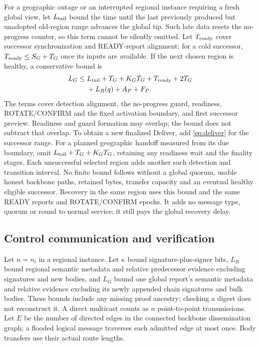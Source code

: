 \documentclass[11pt,a4paper,onecolumn]{article}
\theoremstyle{remark}\newtheorem{example}[definition]{Example}
\begin{document}
For a geographic outage or an interrupted regional instance requiring a fresh
global view, let $L_{\rm tail}$ bound the time until the last
previously produced but unadopted old-region range advances the global tip.
Such late data resets the no-progress counter, so this term cannot be silently
omitted. Let $T_{\rm ready}$ cover successor synchronization and READY-report
alignment; for a cold successor, $T_{\rm ready}\leq S_G+T_G$ once its inputs are
available. If the next chosen region is healthy, a conservative bound is
\begin{equation}\label{eq:georecover}
\begin{split}
 L_G\leq{}&L_{\rm tail}+T_G+K_GT_G+T_{\rm ready}+2T_G\\
          &{}+L_R(q)+A_P+F_P.
\end{split}
\end{equation}
The terms cover detection alignment, the no-progress guard, readiness,
ROTATE/CONFIRM and the fixed activation boundary, and first successor preview.
Readiness and guard formation may overlap; the bound does not subtract that
overlap. To obtain a new finalized Deliver, add \eqref{eq:deliver} for the
successor range. For a planned geographic handoff measured from its due boundary,
omit $L_{\rm tail}+T_G+K_GT_G$, retaining any readiness wait and the finality
stages. Each unsuccessful selected region adds another such detection and
transition interval. No finite bound follows without a global quorum, usable
honest backbone paths, retained bytes, transfer capacity and an eventual healthy
eligible successor. Recovery in the same region uses this bound and the same
READY reports and ROTATE/CONFIRM epochs. It adds no message type, quorum or
round to normal service; it still pays the global recovery delay.


\subsection{Control communication and verification}\label{sec:controlcost}
Let $n=n_i$ in a regional instance. Let $\kappa$ bound signature-plus-signer
bits, $L_R$ bound regional semantic metadata and relative predecessor evidence
excluding signatures and new bodies, and $L_G$ bound one global report's
semantic metadata and relative evidence excluding its newly appended chain
signatures and bulk bodies. These bounds include any missing proof ancestry;
checking a digest does not reconstruct it. A direct multicast counts as $n$
point-to-point transmissions. Let $E$ be the number of directed edges in the
connected backbone dissemination graph; a flooded logical message traverses
each admitted edge at most once. Body transfers use their actual route lengths.
\end{document}
